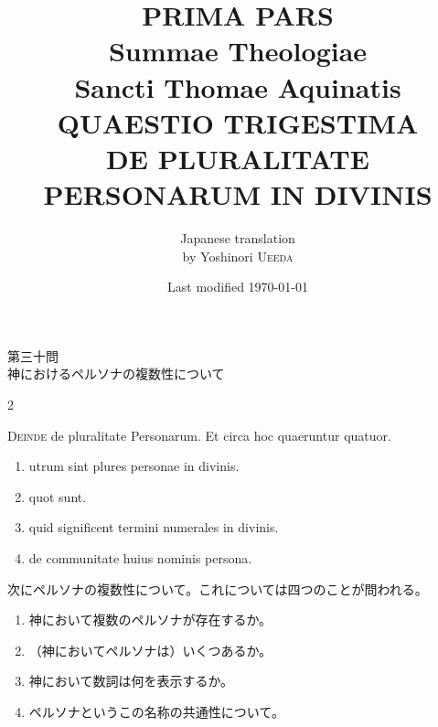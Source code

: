 \documentclass[paper=a4paper,fontsize=10pt,jafontsize=9pt,titlepage]{jlreq}
\title{{\bfseries PRIMA PARS}\\{\Huge Summae Theologiae}\\Sancti Thomae
Aquinatis\\{\sffamily QUAESTIO TRIGESTIMA}\\DE PLURALITATE PERSONARUM
IN DIVINIS}
\author{Japanese translation\\by Yoshinori {\scshape Ueeda}}
\date{Last modified \today}
\begin{document}
\maketitle

\begin{center}
{\Large 第三十問\\神におけるペルソナの複数性について}
\end{center}


\begin{paracol}{2}

{\Huge D}{\scshape einde} de pluralitate Personarum. Et circa hoc quaeruntur
quatuor. 

\begin{enumerate}
 \item utrum sint plures personae in divinis.
 \item quot sunt.
 \item quid significent termini numerales in divinis.
 \item de communitate huius nominis persona.
\end{enumerate}


\switchcolumn


次にペルソナの複数性について。これについては四つのことが問われる。

\begin{enumerate}
 \item 神において複数のペルソナが存在するか。
 \item （神においてペルソナは）いくつあるか。
 \item 神において数詞は何を表示するか。
 \item ペルソナというこの名称の共通性について。
\end{enumerate}


\switchcolumn*



\end{paracol}


\newpage



{}
\setcounter{section}{30}
\setcounter{subsection}{0}
\end{document}
